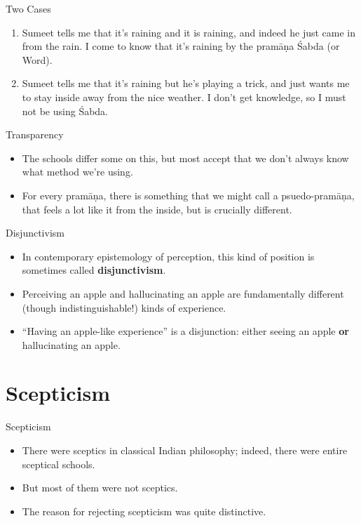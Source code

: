 \documentclass[
  17pt,
  letterpaper,
  ignorenonframetext,
  aspectratio=169,
  handout]{beamer}
\providecommand{\tightlist}{%
  \setlength{\itemsep}{0pt}\setlength{\parskip}{0pt}}\usepackage{longtable,booktabs,array}
\begin{document}
\begin{frame}{Two Cases}
\protect\hypertarget{two-cases}{}
\begin{enumerate}[<+->]
\tightlist
\item
  Sumeet tells me that it's raining and it is raining, and indeed he
  just came in from the rain. I come to know that it's raining by the
  pramāṇa Śabda (or Word).
\item
  Sumeet tells me that it's raining but he's playing a trick, and just
  wants me to stay inside away from the nice weather. I don't get
  knowledge, so I must not be using Śabda.
\end{enumerate}
\end{frame}

\begin{frame}{Transparency}
\protect\hypertarget{transparency}{}
\begin{itemize}[<+->]
\tightlist
\item
  The schools differ some on this, but most accept that we don't always
  know what method we're using.
\item
  For every pramāṇa, there is something that we might call a
  psuedo-pramāṇa, that feels a lot like it from the inside, but is
  crucially different.
\end{itemize}
\end{frame}

\begin{frame}{Disjunctivism}
\protect\hypertarget{disjunctivism}{}
\begin{itemize}[<+->]
\tightlist
\item
  In contemporary epistemology of perception, this kind of position is
  sometimes called \textbf{disjunctivism}.
\item
  Perceiving an apple and hallucinating an apple are fundamentally
  different (though indistinguishable!) kinds of experience.
\item
  ``Having an apple-like experience'' is a disjunction: either seeing an
  apple \textbf{or} hallucinating an apple.
\end{itemize}
\end{frame}

\hypertarget{scepticism}{%
\section{Scepticism}\label{scepticism}}

\begin{frame}{Scepticism}
\protect\hypertarget{scepticism-1}{}
\begin{itemize}[<+->]
\tightlist
\item
  There were sceptics in classical Indian philosophy; indeed, there were
  entire sceptical schools.
\item
  But most of them were not sceptics.
\item
  The reason for rejecting scepticism was quite distinctive.
\end{itemize}
\end{frame}
\end{document}
